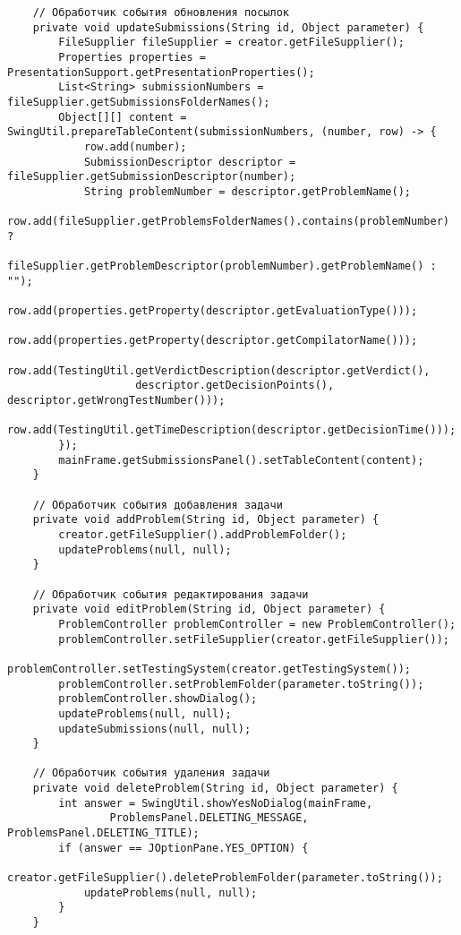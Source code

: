 \begin{verbatim}
    // Обработчик события обновления посылок
    private void updateSubmissions(String id, Object parameter) {
        FileSupplier fileSupplier = creator.getFileSupplier();
        Properties properties = PresentationSupport.getPresentationProperties();
        List<String> submissionNumbers = fileSupplier.getSubmissionsFolderNames();
        Object[][] content = SwingUtil.prepareTableContent(submissionNumbers, (number, row) -> {
            row.add(number);
            SubmissionDescriptor descriptor = fileSupplier.getSubmissionDescriptor(number);
            String problemNumber = descriptor.getProblemName();
            row.add(fileSupplier.getProblemsFolderNames().contains(problemNumber) ?
                    fileSupplier.getProblemDescriptor(problemNumber).getProblemName() : "");
            row.add(properties.getProperty(descriptor.getEvaluationType()));
            row.add(properties.getProperty(descriptor.getCompilatorName()));
            row.add(TestingUtil.getVerdictDescription(descriptor.getVerdict(),
                    descriptor.getDecisionPoints(), descriptor.getWrongTestNumber()));
            row.add(TestingUtil.getTimeDescription(descriptor.getDecisionTime()));
        });
        mainFrame.getSubmissionsPanel().setTableContent(content);
    }
    
    // Обработчик события добавления задачи
    private void addProblem(String id, Object parameter) {
        creator.getFileSupplier().addProblemFolder();
        updateProblems(null, null);
    }
    
    // Обработчик события редактирования задачи
    private void editProblem(String id, Object parameter) {
        ProblemController problemController = new ProblemController();
        problemController.setFileSupplier(creator.getFileSupplier());
        problemController.setTestingSystem(creator.getTestingSystem());
        problemController.setProblemFolder(parameter.toString());
        problemController.showDialog();
        updateProblems(null, null);
        updateSubmissions(null, null);
    }
    
    // Обработчик события удаления задачи
    private void deleteProblem(String id, Object parameter) {
        int answer = SwingUtil.showYesNoDialog(mainFrame,
                ProblemsPanel.DELETING_MESSAGE, ProblemsPanel.DELETING_TITLE);
        if (answer == JOptionPane.YES_OPTION) {
            creator.getFileSupplier().deleteProblemFolder(parameter.toString());
            updateProblems(null, null);
        }
    }
    

\end{verbatim}
